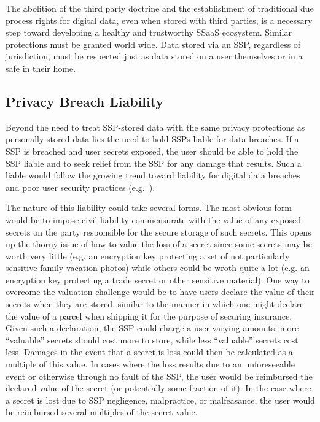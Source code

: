 The abolition of the third party doctrine and the establishment of
traditional due process rights for digital data, even when stored with
third parties, is a necessary step toward developing a healthy and
trustworthy SSaaS ecosystem. Similar protections must be granted world
wide. Data stored via an SSP, regardless of jurisdiction, must be
respected just as data stored on a user themselves or in a safe in
their home.

\subsection{Privacy Breach Liability}
\label{chap:policy:trustworthiness:liability}

Beyond the need to treat SSP-stored data with the same privacy
protections as personally stored data lies the need to hold SSPs
liable for data breaches. If a SSP is breached and user secrets
exposed, the user should be able to hold the SSP liable and to seek
relief from the SSP for any damage that results. Such a liable would
follow the growing trend toward liability for digital data breaches
and poor user security practices (e.g.~\cite{ftc-asus}).

The nature of this liability could take several forms. The most
obvious form would be to impose civil liability commensurate with the
value of any exposed secrets on the party responsible for the secure
storage of such secrets. This opens up the thorny issue of how to
value the loss of a secret since some secrets may be worth very little
(e.g. an encryption key protecting a set of not particularly sensitive
family vacation photos) while others could be wroth quite a lot
(e.g. an encryption key protecting a trade secret or other sensitive
material). One way to overcome the valuation challenge would be to
have users declare the value of their secrets when they are stored,
similar to the manner in which one might declare the value of a parcel
when shipping it for the purpose of securing insurance. Given such a
declaration, the SSP could charge a user varying amounts: more
``valuable'' secrets should cost more to store, while less
``valuable'' secrets cost less. Damages in the event that a secret is
loss could then be calculated as a multiple of this value. In cases
where the loss results due to an unforeseeable event or otherwise
through no fault of the SSP, the user would be reimbursed the declared
value of the secret (or potentially some fraction of it). In the case
where a secret is lost due to SSP negligence, malpractice, or
malfeasance, the user would be reimbursed several multiples of the
secret value.

